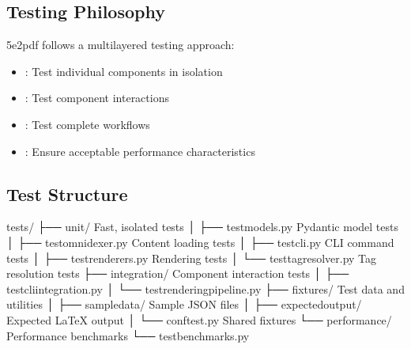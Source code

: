 \documentclass[letterpaper,10pt,english]{sphinxmanual}
\begin{document}
\subsection{Testing Philosophy}
\label{\detokenize{developer/testing:testing-philosophy}}
\sphinxAtStartPar
5e2pdf follows a multi\sphinxhyphen{}layered testing approach:
\begin{itemize}
\item {} 
\sphinxAtStartPar
{}: Test individual components in isolation

\item {} 
\sphinxAtStartPar
{}: Test component interactions

\item {} 
\sphinxAtStartPar
{}: Test complete workflows

\item {} 
\sphinxAtStartPar
{}: Ensure acceptable performance characteristics

\end{itemize}


\subsection{Test Structure}
\label{\detokenize{developer/testing:test-structure}}
\begin{sphinxVerbatim}[commandchars=\\\{\}]
tests/
├── unit/                    \PYGZsh{} Fast, isolated tests
│   ├── test\PYGZus{}models.py       \PYGZsh{} Pydantic model tests
│   ├── test\PYGZus{}omnidexer.py    \PYGZsh{} Content loading tests
│   ├── test\PYGZus{}cli.py          \PYGZsh{} CLI command tests
│   ├── test\PYGZus{}renderers.py    \PYGZsh{} Rendering tests
│   └── test\PYGZus{}tag\PYGZus{}resolver.py \PYGZsh{} Tag resolution tests
├── integration/             \PYGZsh{} Component interaction tests
│   ├── test\PYGZus{}cli\PYGZus{}integration.py
│   └── test\PYGZus{}rendering\PYGZus{}pipeline.py
├── fixtures/                \PYGZsh{} Test data and utilities
│   ├── sample\PYGZus{}data/         \PYGZsh{} Sample JSON files
│   ├── expected\PYGZus{}output/     \PYGZsh{} Expected LaTeX output
│   └── conftest.py          \PYGZsh{} Shared fixtures
└── performance/             \PYGZsh{} Performance benchmarks
    └── test\PYGZus{}benchmarks.py
\end{sphinxVerbatim}
\end{document}
